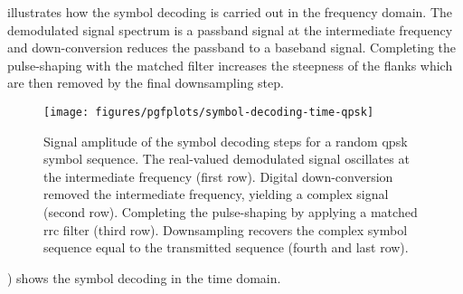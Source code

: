  illustrates how the symbol decoding is carried out in the frequency domain.
The demodulated signal spectrum is a passband signal at the intermediate frequency and down-conversion reduces the passband to a baseband signal.
Completing the pulse-shaping with the matched filter increases the steepness of the flanks which are then removed by the final downsampling step.
\begin{figure}[htb]
	\centering
	\texttt{[image: figures/pgfplots/symbol-decoding-time-qpsk]}
	\caption{Signal amplitude of the symbol decoding steps for a random \gls{qpsk} symbol sequence. The real-valued demodulated signal oscillates at the intermediate frequency (first row). Digital down-conversion removed the intermediate frequency, yielding a complex signal (second row). Completing the pulse-shaping by applying a matched \gls{rrc} filter (third row). Downsampling recovers the complex symbol sequence equal to the transmitted sequence (fourth and last row).}\label{fig:symbol_decoding_time}
\end{figure}
) shows the symbol decoding in the time domain.
